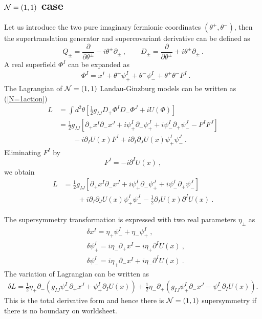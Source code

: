 \documentclass[a4paper,12pt]{article}
\numberwithin{equation}{section}
\newcommand{\del}{\partial}
\newcommand{\nn}{\nonumber\\}
\newcommand{\Ncal}{{\cal N}}
\newcommand{\ta}{\theta}
\newcommand{\deldel}[2]{\frac{\del #1}{\del #2}}
\begin{document}
\subsection{${\cal N}= (1,1)$ case}
\label{11LG}

Let us introduce the two pure imaginary 
fermionic coordinates $(\ta^{+},\ta^{-})$,
then the supertranslation generator
and supercovariant derivative can be defined as
\begin{equation}
 Q_{\pm}=\deldel{}{\ta^{\pm}}-i\ta^{\pm}\del_{\pm}~,\qquad
 D_{\pm}=\deldel{}{\ta^{\pm}}+i\ta^{\pm}\del_{\pm}~.
\end{equation}
A real superfield $\Phi^I$ can be expanded as
\begin{align}
 &\Phi^{I}=x^{I}+\ta^{+}\psi_{+}^{I}
          +\ta^{-}\psi_{-}^{I}+\ta^{+}\ta^{-}F^{I}~.
\end{align}
The Lagrangian of ${\cal N}=(1,1)$ Landau-Ginzburg models 
can be written as (\ref{N=1action})
\begin{align}
 L &=\int d^2 \ta \left[\frac12 g_{IJ} D_{+}\Phi^{I} D_{-}\Phi^{J}
                          + i U(\Phi)\right]\nn
   &=\frac12 g_{IJ}\left[\del_{+}x^{I} \del_{-}x^{J}
           +i \psi_{+}^{I}\del_{-}\psi_{+}^{J}
           +i \psi_{-}^{I}\del_{+}\psi_{-}^{J}
        -F^{I}F^{J} \right] \nn
        & \qquad  - i \del_{I} U(x) F^{I}
      +i  \del_{I}\del_{J} U(x) \psi_{+}^{I} \psi_{-}^{J}  ~.
\end{align}
Eliminating $F^I$ by
\begin{equation}
 F^{I}=- i \del^{I} U(x)~,
\end{equation}
we obtain
\begin{align}
 L&=\frac12 g_{IJ}\left[\del_{+}x^{I} \del_{-}x^{J}
           +i \psi_{+}^{I}\del_{-}\psi_{+}^{J}
           +i \psi_{-}^{I}\del_{+}\psi_{-}^{J} \right] \nn
      & \qquad  + i \del_{I}\del_{J} U(x) \psi_{+}^{I} \psi_{-}^{J}
      - \frac12 \del_{I}U(x) \del^{I}U(x) ~.
\end{align}

The supersymmetry transformation is expressed with two real parameters
$\eta_{\pm}$ as 
\begin{align}
 &\delta x^{I}=\eta_{+} \psi_{-}^{I} + \eta_{-} \psi_{+}^{I}~,\nn
 &\delta \psi_{+}^{I} = i\eta_{-}\del_{+} x^{I}
                               - i \eta_{+} \del^{I} U(x)~,\nn
 &\delta \psi_{-}^{I} = i\eta_{+}\del_{-} x^{I}
                               + i \eta_{-} \del^{I} U(x)~.
\end{align}
The variation of Lagrangian can be written as
\begin{align}
 \delta L =
  \frac12 \eta_{+} \del_{-}\left(g_{IJ}\psi_{-}^{I}\del_{+}x^{J}
         + \psi_{+}^{I} \del_{I} U(x)\right)
 +\frac12 \eta_{-} \del_{+}\left(g_{IJ}\psi_{+}^{I}\del_{-}x^{J}
         - \psi_{-}^{I} \del_{I} U(x)\right).
\label{11variation}
\end{align}
This is the total derivative form and hence there is $\Ncal=(1,1)$
supersymmetry if there is no boundary on worldsheet.
\end{document}
